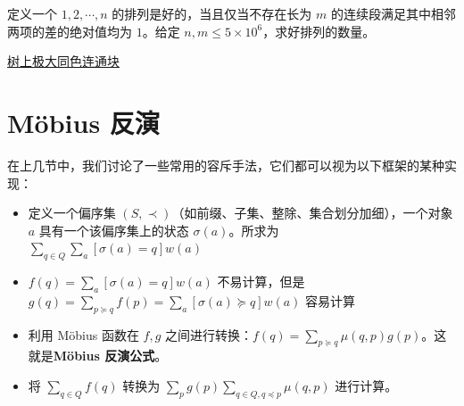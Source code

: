 \begin{exercise}[{U162191 猫的排列计数题}]
定义一个 $1,2,\cdots,n$ 的排列是好的，当且仅当不存在长为 $m$ 的连续段满足其中相邻两项的差的绝对值均为 $1$。给定 $n,m\le 5\times 10^6$，求好排列的数量。
\end{exercise}

\begin{exercise}[P7275 计树]
    
\end{exercise}


\begin{exercise}[{P6151 [集训队作业2019] 青春猪头少年不会梦到兔女郎学姐}]
    
\end{exercise}

\begin{example}
    \href{https://www.luogu.com/article/edia953a}{树上极大同色连通块}    
\end{example}










\section{M{\"o}bius 反演}

在上几节中，我们讨论了一些常用的容斥手法，它们都可以视为以下框架的某种实现：
\begin{itemize}
    \item 定义一个偏序集 $(S,\prec)$（如前缀、子集、整除、集合划分加细），一个对象 $a$ 具有一个该偏序集上的状态 $\sigma(a)$。所求为 $\sum_{q\in Q}\sum_a[\sigma(a)=q] w(a)$
    \item $f(q)=\sum_a [\sigma(a)=q] w(a)$ 不易计算，但是 $g(q)=\sum_{p\succeq q}f(p)=\sum_a [\sigma(a)\succeq q] w(a)$ 容易计算
    \item 利用 M{\"o}bius 函数在 $f,g$ 之间进行转换：$f(q)=\sum_{p\succeq q}\mu(q,p)g(p)$。这就是\textbf{M{\"o}bius 反演公式}。
    \item 将 $\sum_{q\in Q}f(q)$ 转换为 $\sum_{p}g(p)\sum_{q\in Q,q\preceq p}\mu(q,p)$ 进行计算。
\end{itemize}

